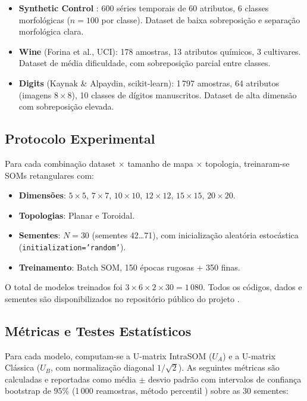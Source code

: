 \documentclass[10pt,journal,compsoc,twocolumn]{IEEEtran}
\begin{document}
\begin{itemize}
    \item \textbf{Synthetic Control} \cite{alcock1999time}: 600 s\'eries
    temporais de 60 atributos, 6 classes morfol\'ogicas ($n=100$ por classe).
    Dataset de baixa sobreposi\c{c}\~ao e separa\c{c}\~ao morfol\'ogica clara.
    \item \textbf{Wine} (Forina et al., UCI): 178 amostras, 13 atributos
    qu\'imicos, 3 cultivares. Dataset de m\'edia dificuldade, com sobreposi\c{c}\~ao
    parcial entre classes.
    \item \textbf{Digits} (Kaynak \& Alpaydin, scikit-learn): 1\,797
    amostras, 64 atributos (imagens $8\times8$), 10 classes de d\'igitos
    manuscritos. Dataset de alta dimens\~ao com sobreposi\c{c}\~ao elevada.
\end{itemize}

\subsection{Protocolo Experimental}
\label{subsec:protocolo}
Para cada combina\c{c}\~ao dataset $\times$ tamanho de mapa $\times$ topologia,
treinaram-se SOMs retangulares com:
\begin{itemize}
    \item \textbf{Dimens\~oes}: $5\times5$, $7\times7$, $10\times10$,
    $12\times12$, $15\times15$, $20\times20$.
    \item \textbf{Topologias}: Planar e Toroidal.
    \item \textbf{Sementes}: $N = 30$ (sementes 42\ldots71), com
    inicializa\c{c}\~ao aleat\'oria estoc\'astica (\texttt{initialization='random'}).
    \item \textbf{Treinamento}: Batch SOM, 150 \'epocas rugosas + 350 finas.
\end{itemize}

O total de modelos treinados foi $3 \times 6 \times 2 \times 30 = 1\,080$.
Todos os c\'odigos, dados e sementes s\~ao disponibilizados no reposit\'orio
p\'ublico do projeto \cite{sandve2013ten, stodden2014implementing}.

\subsection{M\'etricas e Testes Estat\'isticos}
\label{subsec:metricas}
Para cada modelo, computam-se a U-matrix IntraSOM ($U_A$) e a U-matrix
Cl\'assica ($U_B$, com normaliza\c{c}\~ao diagonal $1/\sqrt{2}$). As
seguintes m\'etricas s\~ao calculadas e reportadas como m\'edia $\pm$ desvio
padr\~ao com intervalos de confian\c{c}a bootstrap de $95\%$ (1\,000
reamostras, m\'etodo percentil \cite{efron1994introduction}) sobre as 30
sementes:
\end{document}
